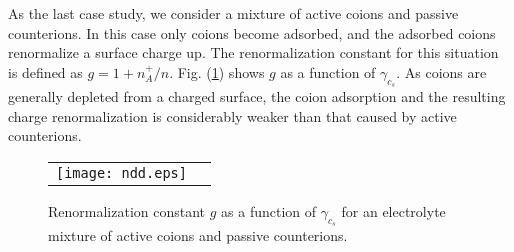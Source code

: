 \documentclass[pre,twocolumn,graphicx]{revtex4-1}
\begin{document}
As the last case study, we consider a mixture of active coions and passive counterions.  In this case only 
coions become adsorbed, and the adsorbed coions renormalize a surface charge up.  
The renormalization constant for this situation is defined as $g=1+n_A^+/n$.  
Fig. (\ref{fig:g4}) shows $g$ as a function of $\gamma_{c_s}$.  As coions are generally depleted 
from a charged surface, the coion adsorption and the resulting charge renormalization
is considerably weaker than that caused by active counterions.  
\graphicspath{{figures/}}
\begin{figure}[h] 
 \begin{center}
 \begin{tabular}{rr}
  \texttt{[image: ndd.eps]}
 \end{tabular}
 \end{center}
\caption{Renormalization constant $g$ as a function of $\gamma_{c_s}$ for an electrolyte mixture 
of active coions and passive counterions.  } 
\label{fig:g4}
\end{figure}

\end{document}
